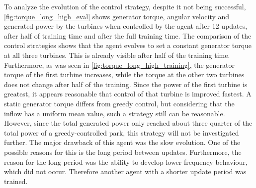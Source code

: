 To analyze the evolution of the control strategy, despite it not being successful, \autoref{fig:torque_long_high_eval} shows generator torque, angular velocity and generated power by the turbines when controlled by the agent after 12 updates, after half of training time and after the full training time. The comparison of the control strategies shows that the agent evolves to set a constant generator torque at all three turbines. This is already visible after half of the training time. Furthermore, as was seen in \autoref{fig:torque_long_high_training}, the generator torque of the first turbine increases, while the torque at the other two turbines does not change after half of the training. Since the power of the first turbine is greatest, it appears reasonable that control of that turbine is improved fastest. A static generator torque differs from greedy control, but considering that the inflow has a uniform mean value, such a strategy still can be reasonable. However, since the total generated power only reached about three quarter of the total power of a greedy-controlled park, this strategy will not be investigated further. The major drawback of this agent was the slow evolution. One of the possible reasons for this is the long period between updates. Furthermore, the reason for the long period was the ability to develop lower frequency behaviour, which did not occur. Therefore another agent with a shorter update period was trained.
